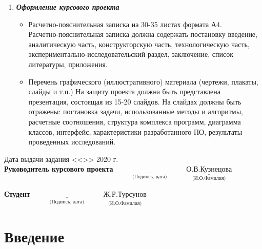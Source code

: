 \documentclass[a4paper, 10pt]{article}
\begin{document}
\begin{titlepage}
\begin{enumerate}
			\item \small {{\textbf{\textit{Оформление курсового проекта}}}
			\begin{itemize}
				\item \footnotesize Расчетно-пояснительная записка на 30-35 листах формата А4.\\
				Расчетно-пояснительная записка должна содержать постановку введение, аналитическую часть, конструкторскую часть, технологическую часть, экспериментально-исследовательский раздел, заключение, список литературы, приложения.
				\item \small Перечень графического (иллюстративного) материала (чертежи, плакаты, слайды и т.п.)   
				На защиту проекта должна быть представлена презентация, состоящая из 15-20 слайдов. На слайдах должны быть отражены: постановка задачи, использованные методы и алгоритмы, расчетные соотношения, структура комплекса программ, диаграмма классов, интерфейс, характеристики разработанного ПО, результаты проведенных исследований.
		\end{itemize}}
		\end{enumerate}
		
		
		\begin{flushleft}
			\small Дата выдачи задания <<\underline{\hspace{1cm}}>> \underline{\hspace{3cm}} 2020 г.
			\\ \small \textbf{Руководитель курсового проекта}
			\small \hspace{3.45cm}$\underset{\text{(Подипсь, дата)}}{\underline{\hspace{4cm}}}$ 
			\small \hspace{4mm}$\underset{\text{(И.О.Фамилия)}}{\underline{\text{О.В.Кузнецова}}}$ 
		\end{flushleft}
		\begin{flushleft}
			\small \textbf{Студент}
			\small \hspace{7.7cm}$\underset{\text{(Подипсь, дата)}}{\underline{\hspace{4cm}}}$ 
			\small \hspace{4mm}$\underset{\text{(И.О.Фамилия)}}{\underline{\text{Ж.Р.Турсунов}}}$ 
		\end{flushleft}
	
\end{titlepage}
\setcounter{page}{3}
\tableofcontents
\clearpage
\newpage


\section*{Введение}
\end{document}
